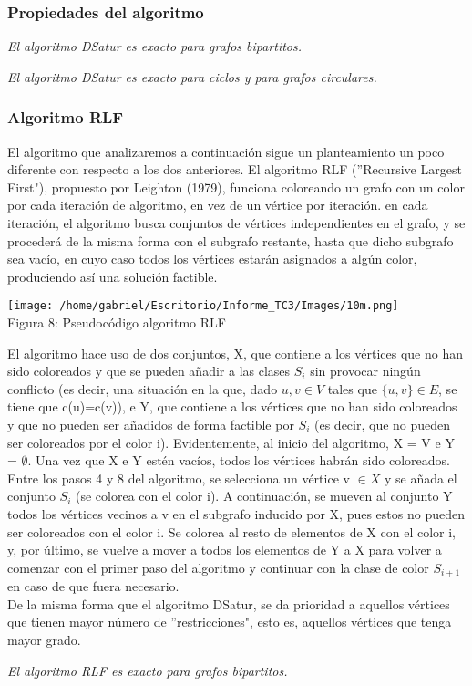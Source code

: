 \documentclass[12pt]{report}
\begin{document}
\subsubsection{Propiedades del algoritmo}
\begin{tm}
\textsl{El algoritmo DSatur es exacto para grafos bipartitos.}
\end{tm}

\begin{tm}
\textsl{El algoritmo DSatur es exacto para ciclos y para grafos circulares.}
\end{tm}

\subsubsection{Algoritmo RLF}
El algoritmo que analizaremos a continuación sigue un planteamiento un poco diferente con respecto a los dos anteriores. El algoritmo RLF (''Recursive Largest First"), propuesto por Leighton (1979), funciona coloreando un grafo con un color por cada iteración de algoritmo, en vez de un vértice por iteración. en cada iteración, el algoritmo busca conjuntos de vértices independientes en el grafo, y se procederá de la misma forma con el subgrafo restante, hasta que dicho subgrafo sea vacío, en cuyo caso todos los vértices estarán asignados a algún color, produciendo así una solución factible.
\begin{center}
\texttt{[image: /home/gabriel/Escritorio/Informe\_TC3/Images/10m.png]}\\
Figura 8: Pseudocódigo algoritmo RLF
\end{center}
El algoritmo hace uso de dos conjuntos, X, que contiene a los vértices que no han sido coloreados y que se pueden añadir a las clases $S_i$ sin provocar ningún conflicto (es decir, una situación en la que, dado $u,v \in V$ tales que $\{u,v\} \in E$, se tiene que c(u)=c(v)), e Y, que contiene a los vértices que no han sido coloreados y que no pueden ser añadidos de forma factible por $S_i$ (es decir, que no pueden ser coloreados por el color i). Evidentemente, al inicio del algoritmo, X = V e Y = $\emptyset$. Una vez que X e Y estén vacíos, todos los vértices habrán sido coloreados. Entre los pasos 4 y 8 del algoritmo, se selecciona un vértice v $\in X$ y se añada el conjunto $S_i$ (se colorea con el color i). A continuación, se mueven al conjunto Y todos los vértices vecinos a v en el subgrafo inducido por X, pues estos no pueden ser coloreados con el color i. Se colorea al resto de elementos de X con el color i, y, por último, se vuelve a mover a todos los elementos de Y a X para volver a comenzar con el primer paso del algoritmo y continuar con la clase de color $S_{i+1}$ en caso de que fuera necesario.\\
De la misma forma que el algoritmo DSatur, se da prioridad a aquellos vértices que tienen mayor número de ''restricciones", esto es, aquellos vértices que tenga mayor grado.
\begin{tm}
\textsl{El algoritmo RLF es exacto para grafos bipartitos.}
\end{tm}
\end{document}
